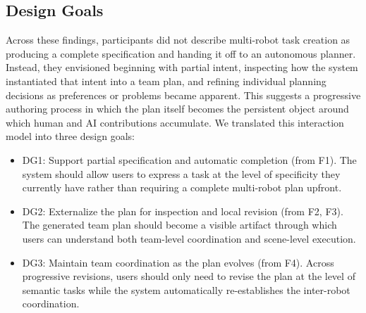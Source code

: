 \subsection{Design Goals}
\label{sec:design-goals}

Across these findings, participants did not describe multi-robot task creation as producing a complete specification and handing it off to an autonomous planner.
Instead, they envisioned beginning with partial intent, inspecting how the system instantiated that intent into a team plan, and refining individual planning decisions as preferences or problems became apparent.
This suggests a progressive authoring process in which the plan itself becomes the persistent object around which human and AI contributions accumulate.
We translated this interaction model into three design goals:

\begin{itemize}

\item{DG1: Support partial specification and automatic completion (from F1).}
The system should allow users to express a task at the level of specificity they currently have rather than requiring a complete multi-robot plan upfront.

\item{DG2: Externalize the plan for inspection and local revision (from F2, F3).}
The generated team plan should become a visible artifact through which users can understand both team-level coordination and scene-level execution.

\item{DG3: Maintain team coordination as the plan evolves (from F4).}
Across progressive revisions, users should only need to revise the plan at the level of semantic tasks while the system automatically re-establishes the inter-robot coordination.

\end{itemize}